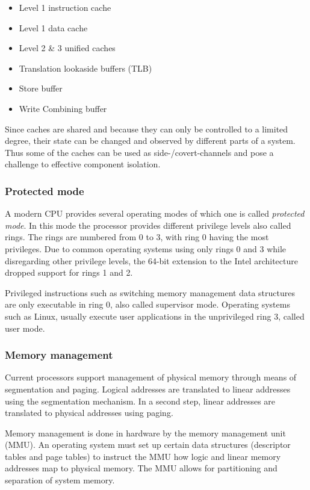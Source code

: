 \begin{itemize}
	\item Level 1 instruction cache
	\item Level 1 data cache
	\item Level 2 \& 3 unified caches
	\item Translation lookaside buffers (TLB)
	\item Store buffer
	\item Write Combining buffer
\end{itemize}

Since caches are shared and because they can only be controlled to a limited
degree, their state can be changed and observed by different parts of a system.
Thus some of the caches can be used as side-/covert-channels and pose a
challenge to effective component isolation.

\subsubsection{Protected mode}
A modern CPU provides several operating modes of which one is called
\emph{protected mode}. In this mode the processor provides different privilege
levels also called rings. The rings are numbered from 0 to 3, with ring 0 having
the most privileges. Due to common operating systems using only rings 0 and 3
while disregarding other privilege levels, the 64-bit extension to the Intel
architecture dropped support for rings 1 and 2.

Privileged instructions such as switching memory management data structures are
only executable in ring 0, also called supervisor mode. Operating systems such
as Linux, usually execute user applications in the unprivileged ring 3, called
user mode.

\subsubsection{Memory management}
Current processors support management of physical memory through means of
segmentation and paging. Logical addresses are translated to linear addresses
using the segmentation mechanism. In a second step, linear addresses are
translated to physical addresses using paging.

Memory management is done in hardware by the memory management unit
(MMU).  An operating system must set up certain data structures
(descriptor tables and page tables) to instruct the MMU how logic and linear
memory addresses map to physical memory. The MMU allows for partitioning and
separation of system memory.


